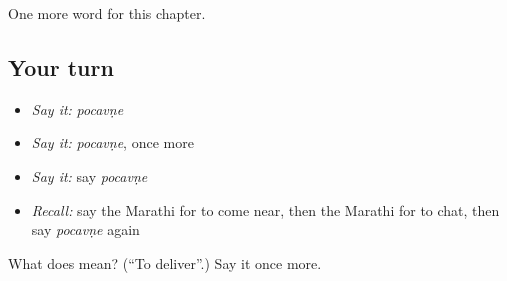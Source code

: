 \begin{grammarlens}[title={What you've built}]
One more word for this chapter.
\end{grammarlens}

\subsection*{Your turn}
\begin{itemize}
\raggedright
  \item \emph{Say it:} \emph{pocavṇe}
  \item \emph{Say it:} \emph{pocavṇe}, once more
  \item \emph{Say it:} say \emph{pocavṇe}
  \item \emph{Recall:} say the Marathi for to come near, then the Marathi for to chat, then say \emph{pocavṇe} again
\end{itemize}

\begin{tcolorbox}[breakable,colback=teal!4,colframe=teal!35!black,title={Before you move on}]
What does  mean? (\textquotedblleft{}To deliver\textquotedblright{}.) Say it once more.
\end{tcolorbox}
